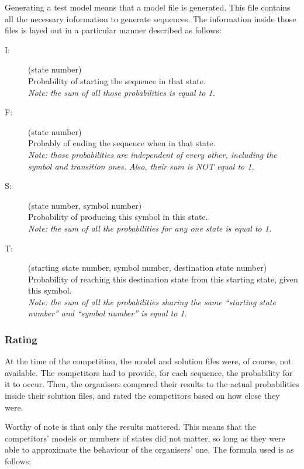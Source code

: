 Generating a test model means that a model file is generated. This
file contains all the necessary information to generate sequences.
The information inside those files is layed out in a particular manner
described as follows:
\begin{description}
\item [{I:}] (state number)\\
Probability of starting the sequence in that state.\\
\textit{Note: the sum of all those probabilities is equal to 1.}
\item [{F:}] (state number)\\
Probably of ending the sequence when in that state\textit{.}\\
\textit{Note: those probabilities are independent of every other,
including the symbol and transition ones. Also, their sum is NOT equal
to 1.}
\item [{S:}] (state number, symbol number)\\
Probability of producing this symbol in this state.\\
\textit{Note: the sum of all the probabilities for any one state is
equal to 1.}
\item [{T:}] (starting state number, symbol number, destination state number)\\
Probability of reaching this destination state from this starting
state, given this symbol.\\
\textit{Note: the sum of all the probabilities sharing the same ``starting
state number'' and ``symbol number'' is equal to 1.}
\end{description}

\subsubsection{Rating}

At the time of the competition, the model and solution files were,
of course, not available. The competitors had to provide, for each
sequence, the probability for it to occur. Then, the organisers compared
their results to the actual probabilities inside their solution files,
and rated the competitors based on how close they were.

Worthy of note is that only the results mattered. This means that
the competitors\textquoteright{} models or numbers of states did not
matter, so long as they were able to approximate the behaviour of
the organisers\textquoteright{} one. The formula used is as follows:

